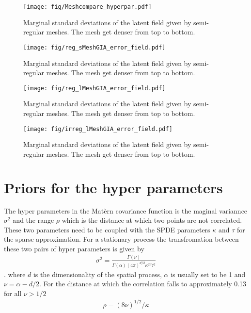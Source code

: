\documentclass[a4paper,12pt]{article}
\begin{document}
\begin{figure}[htbp]
 \begin{center}
 \texttt{[image: fig/Meshcompare\_hyperpar.pdf]}
 \end{center}
 \caption[Semi-regular mesh]{Marginal standard deviations of the latent field given by semi-regular meshes. The mesh get denser from top to bottom.}
 \label{fig:mesh_comp_hyper}
 \end{figure}

\begin{figure}[htbp]
 \begin{center}
 \texttt{[image: fig/reg\_sMeshGIA\_error\_field.pdf]}
 \end{center}
 \caption[Semi-regular mesh]{Marginal standard deviations of the latent field given by semi-regular meshes. The mesh get denser from top to bottom.}
 \label{fig:mesh_comp_hyper}
 \end{figure}

\begin{figure}[htbp]
 \begin{center}
 \texttt{[image: fig/reg\_lMeshGIA\_error\_field.pdf]}
 \end{center}
 \caption[Semi-regular mesh]{Marginal standard deviations of the latent field given by semi-regular meshes. The mesh get denser from top to bottom.}
 \label{fig:mesh_comp_hyper}
 \end{figure}

\begin{figure}[htbp]
 \begin{center}
 \texttt{[image: fig/irreg\_lMeshGIA\_error\_field.pdf]}
 \end{center}
 \caption[Semi-regular mesh]{Marginal standard deviations of the latent field given by semi-regular meshes. The mesh get denser from top to bottom.}
 \label{fig:mesh_comp_hyper}
 \end{figure}
 
\section{Priors for the hyper parameters}\label{sec:hyperpar}
The hyper parameters in the Mat{\`e}rn covariance function is the maginal variannce $\sigma^2$ and the range $\rho$ which is the distance at which two points are not correlated. These two parameters need to be coupled with the SPDE parameters $\kappa$ and $\tau$ for the sparse approximation. For a stationary process the transfromation between these two pairs of hyper parameters is given by 
\begin{align}
\sigma^2 = \frac{\Gamma(\nu)}{\Gamma(\alpha)(4\pi)^{d/2}\kappa^{2\nu} \tau^{2}}
\end{align}. 
where $d$ is the dimensionality of the spatial process, $\alpha$ is usually set to be 1 and $\nu = \alpha -d/2$. For the distance at which the correlation falls to approximately 0.13 for all $\nu > 1/2$
\begin{align}
\rho = (8\nu)^{1/2}/\kappa
\end{align}
\end{document}
